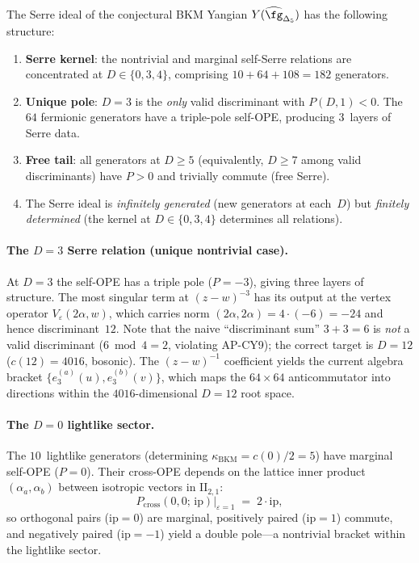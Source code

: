 \begin{conjecture}
\label{conj:deformed-serre-structure}
\ClaimStatusConjectured
The Serre ideal of the conjectural BKM Yangian $Y(\widehat{\fg}_{\Delta_5})$
has the following structure:
\begin{enumerate}
\item \textbf{Serre kernel}: the nontrivial and marginal self-Serre relations
are concentrated at $D \in \{0, 3, 4\}$, comprising $10 + 64 + 108 = 182$
generators.
\item \textbf{Unique pole}: $D = 3$ is the \emph{only} valid discriminant with
$P(D, 1) < 0$. The $64$ fermionic generators have a triple-pole self-OPE,
producing $3$~layers of Serre data.
\item \textbf{Free tail}: all generators at $D \geq 5$ (equivalently, $D \geq 7$
among valid discriminants) have $P > 0$ and trivially commute (free Serre).
\item The Serre ideal is \emph{infinitely generated} (new generators at each~$D$)
but \emph{finitely determined} (the kernel at $D \in \{0, 3, 4\}$ determines
all relations).
\end{enumerate}
\end{conjecture}

\paragraph{The $D = 3$ Serre relation (unique nontrivial case).}
At $D = 3$ the self-OPE has a triple pole ($P = -3$), giving three layers of structure.
The most singular term at $(z-w)^{-3}$ has its output at the vertex operator
$V_\varepsilon(2\alpha, w)$, which carries norm $(2\alpha, 2\alpha) = 4 \cdot (-6) = -24$
and hence discriminant~$12$.  Note that the naive ``discriminant sum'' $3 + 3 = 6$ is
\emph{not} a valid discriminant ($6 \bmod 4 = 2$, violating AP-CY9); the correct target
is $D = 12$ ($c(12) = 4016$, bosonic).  The $(z-w)^{-1}$ coefficient yields the
current algebra bracket $\{e_3^{(a)}(u), e_3^{(b)}(v)\}$, which maps the
$64 \times 64$ anticommutator into directions within the $4016$-dimensional $D = 12$ root space.

\paragraph{The $D = 0$ lightlike sector.}
The $10$~lightlike generators (determining $\kappa_{\mathrm{BKM}} = c(0)/2 = 5$)
have marginal self-OPE ($P = 0$).  Their cross-OPE depends on the lattice inner
product $(\alpha_a, \alpha_b)$ between isotropic vectors in $\mathrm{II}_{2,1}$:
\[
P_{\mathrm{cross}}(0, 0;\, \mathrm{ip})\big|_{\varepsilon = 1}
\;=\; 2 \cdot \mathrm{ip},
\]
so orthogonal pairs ($\mathrm{ip} = 0$) are marginal, positively paired ($\mathrm{ip} = 1$)
commute, and negatively paired ($\mathrm{ip} = -1$) yield a double pole---a
nontrivial bracket within the lightlike sector.

